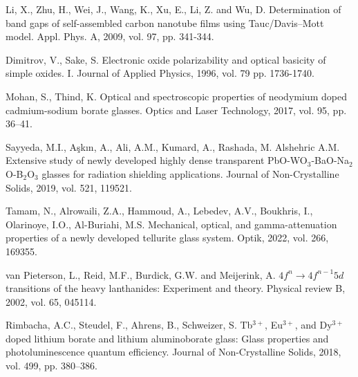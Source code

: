 \documentclass[press]{vestnik}
\begin{document}
\begin{thebibliography}{22}
Li, X., Zhu, H., Wei, J., Wang, K., Xu, E., Li, Z. and Wu, D. 
Determination of band gaps of self-assembled carbon nanotube films using 
Tauc/Davis--Mott model. Appl. Phys. A, 2009, vol. 97, pp. 341-344. 

Dimitrov, V., Sake, S. Electronic oxide polarizability and optical 
basicity of simple oxides. I. Journal of Applied Physics, 1996, vol. 79 pp. 
1736-1740. 

Mohan, S., Thind, K. Optical and spectroscopic properties of neodymium 
doped cadmium-sodium borate glasses. Optics and Laser Technology, 2017, vol. 
95, pp. 36--41. 

Sayyeda, M.I., A\c{s}k\i n, A., Ali, A.M., Kumard, A., Rashada, M. 
Alshehric A.M. Extensive study of newly developed highly dense transparent 
PbO-WO$_{3}$-BaO-Na$_{2}$O-B$_{2}$O$_{3}$ glasses for radiation shielding 
applications. Journal of Non-Crystalline Solids, 2019, vol. 521, 119521. 

Tamam, N., Alrowaili, Z.A., Hammoud, A., Lebedev, A.V., Boukhris, I., 
Olarinoye, I.O., Al-Buriahi, M.S. Mechanical, optical, and gamma-attenuation 
properties of a newly developed tellurite glass system. Optik, 2022, vol. 
266, 169355. 

van Pieterson, L., Reid, M.F., Burdick, G.W. and Meijerink, A. 
$4f^{n}\to 4f^{n-1} 5d$ transitions of the heavy lanthanides: Experiment and 
theory. Physical review B, 2002, vol. 65, 045114. 

Rimbacha, A.C., Steudel, F., Ahrens, B., Schweizer, S. Tb$^{3+}$, 
Eu$^{3+}$, and Dy$^{3+}$ doped lithium borate and lithium aluminoborate 
glass: Glass properties and photoluminescence quantum efficiency. Journal of 
Non-Crystalline Solids, 2018, vol. 499, pp. 380--386. 
\end{thebibliography}
\end{document}
